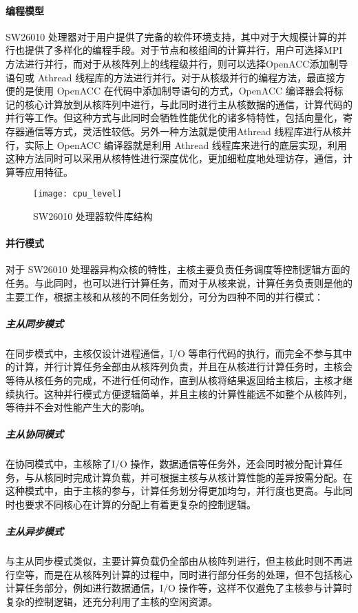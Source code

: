 \paragraph{编程模型}
SW26010 处理器对于用户提供了完备的软件环境支持，其中对于大规模计算的并行也提供了多样化的编程手段。对于节点和核组间的计算并行，用户可选择MPI 方法进行并行，而对于从核阵列上的线程级并行，则可以选择OpenACC添加制导语句或 Athread 线程库的方法进行并行。对于从核级并行的编程方法，最直接方便的是使用 OpenACC 在代码中添加制导语句的方式，OpenACC 编译器会将标记的核心计算放到从核阵列中进行，与此同时进行主从核数据的通信，计算代码的并行等工作。但这种方式与此同时会牺牲性能优化的诸多特特性，包括向量化，寄存器通信等方式，灵活性较低。另外一种方法就是使用Athread 线程库进行从核并行，实际上 OpenACC 编译器就是利用 Athread 线程库来进行的底层实现，利用这种方法同时可以采用从核特性进行深度优化，更加细粒度地处理访存，通信，计算等应用特征。

 \begin{figure}[h]
  \centering
  \texttt{[image: cpu\_level]}
  \caption{SW26010 处理器软件库结构}
\end{figure}

\paragraph{并行模式}
对于 SW26010 处理器异构众核的特性，主核主要负责任务调度等控制逻辑方面的任务。与此同时，也可以进行计算任务，而对于从核来说，计算任务负责则是他的主要工作，根据主核和从核的不同任务划分，可分为四种不同的并行模式：
\subparagraph{主从同步模式}
在同步模式中，主核仅设计进程通信，I/O 等串行代码的执行，而完全不参与其中的计算，并行计算任务全部由从核阵列负责，并且在从核进行计算任务时，主核会等待从核任务的完成，不进行任何动作，直到从核将结果返回给主核后，主核才继续执行。这种并行模式方便逻辑简单，并且主核的计算性能远不如整个从核阵列，等待并不会对性能产生大的影响。

\subparagraph{主从协同模式}
在协同模式中，主核除了I/O 操作，数据通信等任务外，还会同时被分配计算任务，与从核同时完成计算负载，并可根据主核与从核计算性能的差异按需分配。在这种模式中，由于主核的参与，计算任务划分得更加均匀，并行度也更高。与此同时也要求不同核心在计算的分配上有着更复杂的控制逻辑。

\subparagraph{主从异步模式}
与主从同步模式类似，主要计算负载仍全部由从核阵列进行，但主核此时则不再进行空等，而是在从核阵列计算的过程中，同时进行部分任务的处理，但不包括核心计算任务部分，例如进行数据通信，I/O 操作等，这样不仅避免了主核参与计算时复杂的控制逻辑，还充分利用了主核的空闲资源。

